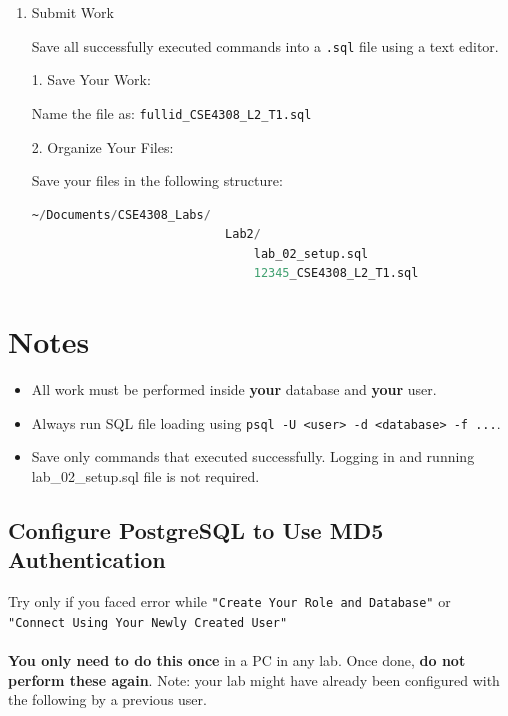 \documentclass[12pt,a4paper]{article}
\begin{document}
\begin{enumerate}
\item Submit Work

Save all successfully executed commands into a \texttt{.sql} file using a text editor.

1. Save Your Work:

   Name the file as: \texttt{fullid\_CSE4308\_L2\_T1.sql}

2. Organize Your Files:

   Save your files in the following structure:

   \begin{lstlisting}[language=SQL]
   ~/Documents/CSE4308_Labs/
                           Lab2/
                               lab_02_setup.sql
                               12345_CSE4308_L2_T1.sql
   \end{lstlisting}

\end{enumerate}

\section*{Notes}
\begin{itemize}
\item All work must be performed inside \textbf{your} database and \textbf{your} user.
\item Always run SQL file loading using \texttt{psql -U <user> -d <database> -f ...}.
\item Save only commands that executed successfully. Logging in and running lab\_02\_setup.sql file is not required.
\end{itemize}
\newpage
\subsection*{Configure PostgreSQL to Use MD5 Authentication}
Try only if you faced error while \texttt{"Create Your Role and Database"} or \texttt{"Connect Using Your Newly Created User"}\\\\
\textbf{You only need to do this once} in a PC in any lab. Once done, \textbf{do not perform these again}. Note: your lab might have already been configured with the following by a previous user.\\
\end{document}
